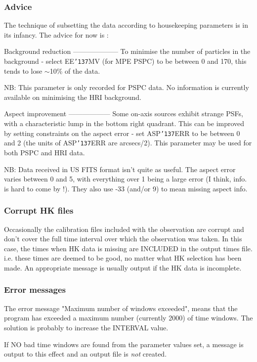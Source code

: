 \documentclass{book}
\renewcommand{\_}{{\tt\char'137}}     %
\begin{document}
\subsubsection{Advice}
The technique of subsetting the data according to housekeeping
parameters is in its infancy. The advice for now is :
 
Background reduction
--------------------
To minimise the number of particles in the background -
select EE\_MV (for MPE PSPC) to be between 0 and 170, this tends
to lose $\sim$10\% of the data.
 
NB: This parameter is only recorded for PSPC
data. No information is currently available on minimising the
HRI background.
 
Aspect improvement
------------------
Some on-axis sources exhibit strange PSFs, with a characteristic
lump in the bottom right quadrant. This can be improved by
setting constraints on the aspect error - set ASP\_ERR to be
between 0 and 2 (the units of ASP\_ERR are arcsecs/2). This
parameter may be used for both PSPC and HRI data.
 
NB: Data received in US FITS format isn't quite as useful.
The aspect error varies between 0 and 5, with everything over
1 being a large error (I think, info. is hard to come by !).
They also use -33 (and/or 9) to mean missing aspect info.
 
\subsubsection{Corrupt HK files}
Occasionally the calibration files included with the observation are
corrupt and don't cover the full time interval over which the
observation was taken. In this case, the times when HK data is missing
are INCLUDED in the output times file. i.e. these times are deemed to be
good, no matter what HK selection has been made. An appropriate message
is usually output if the HK data is incomplete.
 
\subsubsection{Error messages}
The error message "Maximum number of windows exceeded", means that
the program has exceeded a maximum number (currently 2000) of time
windows. The solution is probably to increase the INTERVAL value.
 
If NO bad time windows are found from the parameter values set, a
message is output to this effect and an output file is {\em not} created.
 
\end{document}
